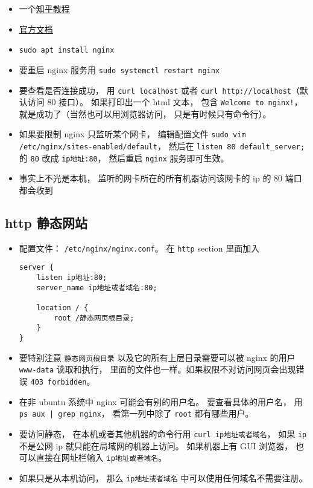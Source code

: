 
\begin{issues}
\issueDraft
\end{issues}

\begin{itemize}
\item 一个\href{https://zhuanlan.zhihu.com/p/80600540}{知乎教程}
\item \href{https://nginx.org/en/docs/}{官方文档}
\item \verb|sudo apt install nginx|
\item 要重启 nginx 服务用 \verb|sudo systemctl restart nginx|
\item 要查看是否连接成功， 用 \verb|curl localhost| 或者 \verb|curl http://localhost|（默认访问 80 接口）。 如果打印出一个 html 文本， 包含 \verb|Welcome to nginx!|， 就是成功了（当然也可以用浏览器访问， 只是有时候只有命令行）。
\item 如果要限制 nginx 只监听某个网卡， 编辑配置文件 \verb|sudo vim /etc/nginx/sites-enabled/default|， 然后在 \verb|listen 80 default_server;| 的 \verb|80| 改成 \verb|ip地址:80|， 然后重启 \verb|nginx| 服务即可生效。
\item 事实上不光是本机， 监听的网卡所在的所有机器访问该网卡的 ip 的 80 端口都会收到
\end{itemize}

\subsection{http 静态网站}
\begin{itemize}
\item 配置文件： \verb|/etc/nginx/nginx.conf|。 在 \verb|http| section 里面加入
\begin{lstlisting}[language=none]
server {
    listen ip地址:80;
    server_name ip地址或者域名:80;
    
    location / {
        root /静态网页根目录;
    }
}
\end{lstlisting}
\item 要特别注意 \verb|静态网页根目录| 以及它的所有上层目录需要可以被 nginx 的用户 \verb|www-data| 读取和执行， 里面的文件也一样。如果权限不对访问网页会出现错误 \verb|403 forbidden|。
\item 在非 ubuntu 系统中 nginx 可能会有别的用户名。  要查看具体的用户名， 用 \verb`ps aux | grep nginx`， 看第一列中除了 \verb|root| 都有哪些用户。
\item 要访问静态， 在本机或者其他机器的命令行用 \verb|curl ip地址或者域名|， 如果 \verb|ip| 不是公网 ip 就只能在局域网的机器上访问。 如果机器上有 GUI 浏览器， 也可以直接在网址栏输入 \verb|ip地址或者域名|。
\item 如果只是从本机访问， 那么 \verb|ip地址或者域名| 中可以使用任何域名不需要注册。
\end{itemize}

